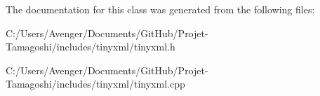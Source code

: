 The documentation for this class was generated from the following files\+:\begin{DoxyCompactItemize}
\item 
C\+:/\+Users/\+Avenger/\+Documents/\+Git\+Hub/\+Projet-\/\+Tamagoshi/includes/tinyxml/tinyxml.\+h\item 
C\+:/\+Users/\+Avenger/\+Documents/\+Git\+Hub/\+Projet-\/\+Tamagoshi/includes/tinyxml/tinyxml.\+cpp\end{DoxyCompactItemize}
